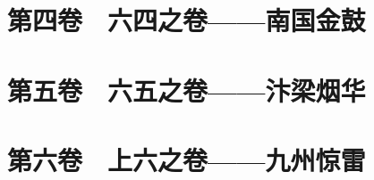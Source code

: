 \documentclass[a4paper,UTF8]{ctexbook}
\begin{document}
\begin{CJK*}{UTF8}{song}
\chapter{第四卷　六四之卷——南国金鼓}


% 
% 
% 

\chapter{第五卷　六五之卷——汴梁烟华}


% 
% 
% 

\chapter{第六卷　上六之卷——九州惊雷}


% 
% 
% 


\end{CJK*}
\end{document}
